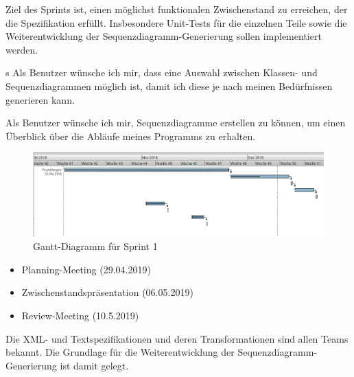 Ziel des Sprints ist, einen möglichst funktionalen Zwischenstand zu erreichen, der die Spezifikation erfüllt. Insbesondere Unit-Tests für die einzelnen Teile sowie die Weiterentwicklung der Sequenzdiagramm-Generierung sollen implementiert werden.

\nsecend

s
Als Benutzer wünsche ich mir, dass eine Auswahl zwischen Klassen- und Sequenzdiagrammen möglich ist, damit ich diese je nach meinen Bedürfnissen generieren kann.
\nsecend

Als Benutzer wünsche ich mir, Sequenzdiagramme erstellen zu können, um einen Überblick über die Abläufe meines Programms zu erhalten.
\nsecend
\nsecend%
\nsecend %

\begin{figure}[hbtp]
\centering
\includegraphics[width=\textwidth]{Bilder/gantt}
\caption{Gantt-Diagramm für Sprint 1}
\end{figure}
\nsecend%

\begin{itemize}
\item Planning-Meeting (29.04.2019)
\item Zwischenstandspräsentation (06.05.2019)
\item Review-Meeting (10.5.2019)
\end{itemize}
\nsecend%

Die XML- und Textspezifikationen und deren Transformationen sind allen Teams bekannt. Die Grundlage für die Weiterentwicklung der Sequenzdiagramm-Generierung ist damit gelegt. 
\nsecend

